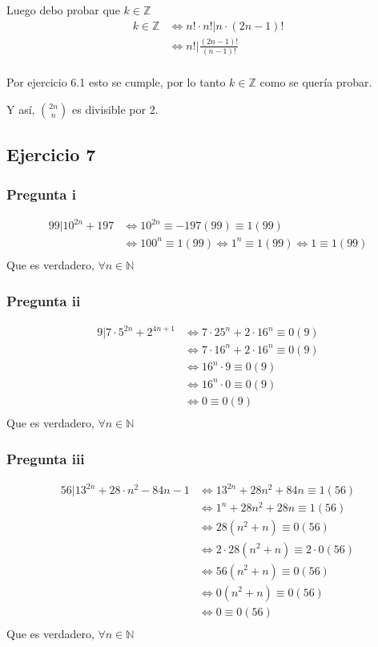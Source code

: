 Luego debo probar que $k \in \mathbb{Z}$
\begin{align*}
    k \in \mathbb{Z} &\iff n!\cdot n! | n \cdot (2n-1)! \\
    &\iff n! | \frac{(2n-1)!}{(n-1)!} \\
\end{align*}

Por ejercicio 6.1 esto se cumple, por lo tanto $ k \in \mathbb{Z} $ como se quería probar.

Y así, $\binom{2n}{n}$ es divisible por 2.

\subsection{Ejercicio 7}
\subsubsection{Pregunta i}
\begin{align*}
    99 | 10^{2n} + 197 &\iff 10^{2n} \equiv -197(99) \equiv 1(99) \\
    &\iff 100^{n} \equiv 1(99) \iff 1^n \equiv 1(99) \iff 1 \equiv 1(99) \\
\end{align*}
Que es verdadero, $ \forall n \in \mathbb{N} $

\subsubsection{Pregunta ii}
\begin{align*}
    9| 7\cdot 5^{2n} + 2^{4n+1} &\iff 7\cdot 25^n + 2\cdot 16^n \equiv 0(9) \\
    &\iff 7\cdot 16^n + 2\cdot 16^n \equiv 0(9) \\
    &\iff 16^n \cdot 9 \equiv 0(9) \\
    &\iff 16^n \cdot 0 \equiv 0(9) \\
    &\iff 0 \equiv 0(9) \\
\end{align*}
Que es verdadero, $ \forall n \in \mathbb{N} $

\subsubsection{Pregunta iii}
\begin{align*}
    56 | 13^{2n} + 28 \cdot n^2 - 84n -1 &\iff 13^{2n} + 28n^2 + 84n \equiv 1 (56) \\
    &\iff 1^{n} + 28n^2 + 28n \equiv 1 (56) \\
    &\iff 28(n^2+n)\equiv 0 (56) \\
    &\iff 2\cdot 28(n^2+n)\equiv 2\cdot 0 (56) \\
    &\iff 56(n^2+n)\equiv 0 (56) \\
    &\iff 0(n^2+n)\equiv 0 (56) \\
    &\iff 0\equiv 0 (56) \\
\end{align*}
Que es verdadero, $ \forall n \in \mathbb{N} $

